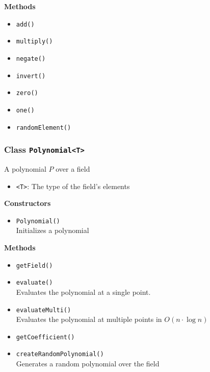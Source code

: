 \textbf{Methods}
\begin{itemize}
\item \lstinline|add()| \\


\item \lstinline|multiply()| \\


\item \lstinline|negate()| \\


\item \lstinline|invert()| \\


\item \lstinline|zero()| \\


\item \lstinline|one()| \\


\item \lstinline|randomElement()| \\


\end{itemize}

\subsubsection{Class \lstinline|Polynomial<T>|}
A polynomial $P$ over a field
\begin{itemize}
\item \lstinline|<T>|: The type of the field's elements
\end{itemize}

\textbf{Constructors}
\begin{itemize}
\item \lstinline|Polynomial()| \\
Initializes a polynomial

\end{itemize}

\textbf{Methods}
\begin{itemize}
\item \lstinline|getField()| \\


\item \lstinline|evaluate()| \\
Evaluates the polynomial at a single point.

\item \lstinline|evaluateMulti()| \\
Evaluates the polynomial at multiple points in $O\left(n \cdot \log
 n\right)$

\item \lstinline|getCoefficient()| \\


\item \lstinline|createRandomPolynomial()| \\
Generates a random polynomial over the field

\end{itemize}

